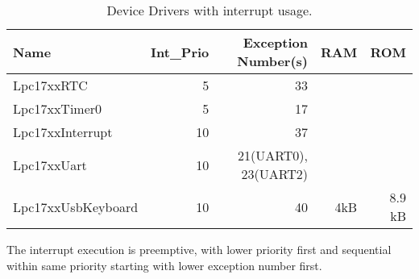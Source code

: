 \begin{table}
\begin{tabular}{|l|r|r|r|r|}
\hline
Name             & Int\_Prio & Exception Number(s) & RAM & ROM \\
\hline
Lpc17xxRTC       &  5 & 33 \\ 
Lpc17xxTimer0    &  5 &  17 \\
Lpc17xxInterrupt & 10 &  37 \\
Lpc17xxUart      & 10 &  21(UART0), 23(UART2) \\ 
Lpc17xxUsbKeyboard  & 10 &  40 & 4kB & 8.9 kB \\ 
\hline
\end{tabular}
\caption{Device Drivers with interrupt usage.}
\label{lpc17_device_list}
\end{table}

The interrupt execution is preemptive, with lower priority first and 
sequential within same priority starting with lower exception number first.

